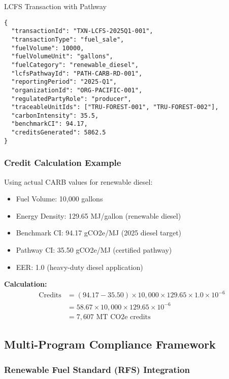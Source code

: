 \begin{jsonexample}{LCFS Transaction with Pathway}
\begin{verbatim}
{
  "transactionId": "TXN-LCFS-2025Q1-001",
  "transactionType": "fuel_sale",
  "fuelVolume": 10000,
  "fuelVolumeUnit": "gallons",
  "fuelCategory": "renewable_diesel",
  "lcfsPathwayId": "PATH-CARB-RD-001",
  "reportingPeriod": "2025-Q1",
  "organizationId": "ORG-PACIFIC-001",
  "regulatedPartyRole": "producer",
  "traceableUnitIds": ["TRU-FOREST-001", "TRU-FOREST-002"],
  "carbonIntensity": 35.5,
  "benchmarkCI": 94.17,
  "creditsGenerated": 5862.5
}
\end{verbatim}
\end{jsonexample}

\subsubsection{Credit Calculation Example}

Using actual CARB values for renewable diesel:

\begin{itemize}
    \item Fuel Volume: 10,000 gallons
    \item Energy Density: 129.65 MJ/gallon (renewable diesel)
    \item Benchmark CI: 94.17 gCO2e/MJ (2025 diesel target)
    \item Pathway CI: 35.50 gCO2e/MJ (certified pathway)
    \item EER: 1.0 (heavy-duty diesel application)
\end{itemize}

\textbf{Calculation:}
\begin{align}
\text{Credits} &= (94.17 - 35.50) \times 10,000 \times 129.65 \times 1.0 \times 10^{-6} \\
&= 58.67 \times 10,000 \times 129.65 \times 10^{-6} \\
&= 7,607 \text{ MT CO2e credits}
\end{align}

\subsection{Multi-Program Compliance Framework}
\label{sec:multi-program}

\subsubsection{Renewable Fuel Standard (RFS) Integration}

